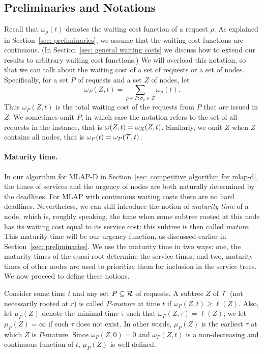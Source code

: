 \documentclass[a4paper]{article}
\newcommand{\calR}{{\cal R}}
\newcommand{\calT}{{\cal T}}
\newcommand{\length}{\ell}
\newcommand{\MLAP}{\mbox{\rm\textsf{MLAP}}}
\newcommand{\MLAPD}{\mbox{\rm\textsf{MLAP-D}}}
\newcommand{\trignode}{\sigma}
\newcommand{\treematurity}{\mu}
\begin{document}
\subsection{Preliminaries and Notations}
\label{subsec: mlap notations}

Recall that $\omega_\rho(t)$ denotes the waiting cost function of a request
$\rho$. As explained in Section~\ref{sec: preliminaries}, we assume that 
the waiting cost functions are continuous. 
(In Section~\ref{sec: general waiting costs} we discuss how to extend our
results to arbitrary waiting cost functions.)
We will overload this notation, so that we can talk about the waiting
cost of a set of requests or a set of
nodes. Specifically, for a set $P$ of requests and a set $Z$ of
nodes, let
\begin{equation*}
\omega_P(Z,t) = \sum_{\rho\in P: \trignode_\rho\in Z} \omega_\rho(t).
\end{equation*}
Thus $\omega_P(Z,t)$ is the total waiting cost of the requests from
$P$ that are issued in $Z$. 
We sometimes omit $P$, in which case the notation refers to the set of
all requests in the instance, that is $\omega(Z,t) = \omega_{\calR}(Z,t)$. 
Similarly, we omit $Z$ when $Z$ contains all nodes,
that is $\omega_P(t) = \omega_P(\calT,t)$.


\paragraph{Maturity time.}

In our algorithm for {\MLAPD} in Section~\ref{sec: competitive algorithm for mlap-d}, 
the times of services and the
urgency of nodes are both naturally determined by the deadlines. For
{\MLAP} with continuous waiting costs there are no hard deadlines. 
Nevertheless, we can still introduce the notion of \emph{maturity
  time} of a node, which is, roughly speaking, the time when some 
subtree rooted at this node has its waiting cost equal to its
service cost; this subtree is then called \emph{mature}.
This maturity time will be our urgency function, as discussed 
earlier in Section~\ref{sec: preliminaries}. We use the maturity
time in two ways: one, the maturity times of the 
quasi-root determine the service times, and two, maturity times
of other nodes are used to prioritize them for inclusion in
the service trees. We now proceed to define these notions.

Consider some time $t$ and any set $P\subseteq\calR$ of requests. A
subtree $Z$ of $\calT$ (not necessarily rooted at $r$) is called
\emph{$P$-mature} at time $t$ if $\omega_P(Z,t) \ge \length(Z)$.
Also, let $\treematurity_P(Z)$ denote the minimal time $\tau$ such
that $\omega_P(Z,\tau) = \length(Z)$; we let $\treematurity_P(Z) =
\infty$ if such $\tau$ does not exist. In other words,
$\treematurity_P(Z)$ is the earliest $\tau$ at which $Z$ is
$P$-mature. Since $\omega_P(Z,0)=0$ and $\omega_P(Z,t)$ is a
non-decreasing and continuous function of $t$, $\treematurity_P(Z)$ is
well-defined.
\end{document}
